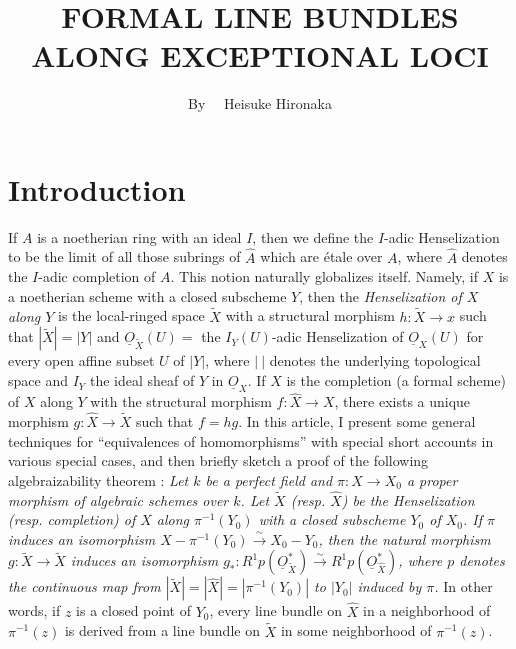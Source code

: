 \title{FORMAL LINE BUNDLES ALONG EXCEPTIONAL LOCI}

\author{By~~ Heisuke Hironaka}

\date{}

\maketitle

\setcounter{pageoriginal}{200}
\section*{Introduction}\label{art10-sec1}\pageoriginale

If $A$ is a noetherian ring with an ideal $I$, then we define the $I$-adic Henselization to be the limit of all those subrings of $\widehat{A}$ which are \'etale over $A$, where $\widehat{A}$ denotes the $I$-adic completion of $A$. This notion naturally globalizes itself. Namely, if $X$ is a noetherian scheme with a closed subscheme $Y$, then the {\em Henselization of $X$ along $Y$} is the local-ringed space $\widetilde{X}$ with a structural morphism $h:\widetilde{X}\to x$ such that $|\widetilde{X}|=|Y|$ and $\underline{O}_{\widetilde{X}}(U)=$ the $I_{Y}(U)$-adic Henselization of $\underline{O}_{X}(U)$ for every open affine subset $U$ of $|Y|$, where $|~|$ denotes the underlying topological space and $I_{Y}$ the ideal sheaf of $Y$ in $\underline{O}_{X}$. If $\widehat{X}$ is the completion (a formal scheme) of $X$ along $Y$ with the structural morphism $f:\widehat{X}\to X$, there exists a unique morphism $g:\widehat{X}\to \widetilde{X}$ such that $f=hg$. In this article, I present some general techniques for ``equivalences of homomorphisms'' with special short accounts in various special cases, and then briefly sketch a proof of the following algebraizability theorem : {\em Let $k$ be a perfect field and $\pi:X\to X_{0}$ a proper morphism of algebraic schemes over $k$. Let $\widetilde{X}$ (resp. $\widehat{X}$) be the Henselization (resp. completion) of $X$ along $\pi^{-1}(Y_{0})$ with a closed subscheme $Y_{0}$ of $X_{0}$. If $\pi$ induces an isomorphism $X-\pi^{-1}(Y_{0})\xrightarrow{\sim}X_{0}-Y_{0}$, then the natural morphism $g:\widetilde{X}\to \widetilde{X}$ induces an isomorphism $g_{*}:R^{1}p(\underline{O}_{\widetilde{X}}^{*})\xrightarrow{\sim}R^{1}p(\underline{O}_{\widehat{X}}^{*})$, where $p$ denotes the continuous map from $|\widetilde{X}|=|\widehat{X}|=|\pi^{-1}(Y_{0})|$ to $|Y_{0}|$ induced by $\pi$.} In other words, if $z$ is a closed point of $Y_{0}$, every line bundle on $\widehat{X}$ in a neighborhood of $\pi^{-1}(z)$ is derived from a line bundle on $\widetilde{X}$ in some neighborhood of $\pi^{-1}(z)$.

